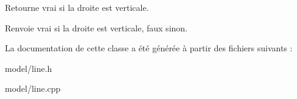 Retourne vrai si la droite est verticale. 

\begin{DoxyReturn}{Renvoie}
vrai si la droite est verticale, faux sinon. 
\end{DoxyReturn}


La documentation de cette classe a été générée à partir des fichiers suivants \+:\begin{DoxyCompactItemize}
\item 
model/line.\+h\item 
model/line.\+cpp\end{DoxyCompactItemize}
